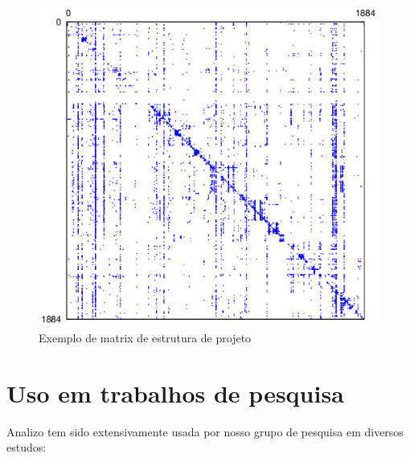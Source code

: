 \begin{figure}[h]
\center
\includegraphics[scale=0.3]{imagens/sample-dsm.png}
\caption{Exemplo de matrix de estrutura de projeto}
\label{sample-dsm}
\end{figure}

\section{Uso em trabalhos de pesquisa}
\label{trabalhos-analizo}

Analizo tem sido extensivamente usada por nosso grupo de pesquisa em diversos
estudos:

